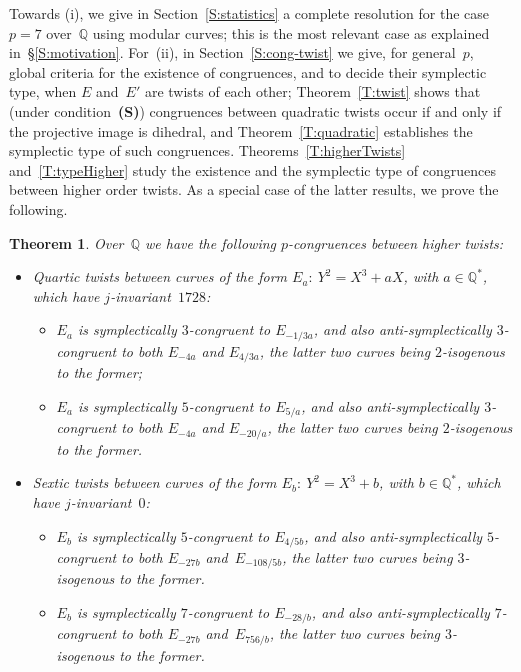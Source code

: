 \documentclass[twoside,leqno,symbols-for-thanks, draft]{rmi}
\numberwithin{equation}{section}
\newcommand{\Q}{\mathbb{Q}}
\newtheorem{theorem}{Theorem}[section]
\theoremstyle{remark}
\begin{document}
Towards (i), we give in Section~\ref{S:statistics} a complete
resolution for the case~$p=7$ over~$\Q$ using modular curves; this is the most relevant case as explained in~\S\ref{S:motivation}.
For~(ii), in
Section~\ref{S:cong-twist} we give, for general~$p$, global criteria
for the existence of congruences, and to decide their symplectic type, when $E$
and~$E'$ are twists of each other; Theorem~\ref{T:twist} shows that
(under condition~{\bf(S)}) congruences between quadratic twists occur if
and only if the projective image is dihedral, and
Theorem~\ref{T:quadratic} establishes the symplectic type of such
congruences. Theorems~\ref{T:higherTwists} and~\ref{T:typeHigher}
study the existence and the symplectic type of congruences between
higher order twists.  As a special case of the latter results, we prove
the following.

\begin{theorem}
\label{T:higherTwistsQ}
Over~$\Q$ we have the following 
$p$-congruences between higher twists:
\begin{itemize}
\item Quartic twists between curves of the form $E_a:\ Y^2=X^3+aX$,
  with $a \in \Q^*$, which have $j$-invariant~$1728$:
  \begin{itemize}
    \item
   $E_a$ is symplectically $3$-congruent to $E_{-1/3a}$, and also
      anti-symplectically $3$-congruent to both $E_{-4a}$ and
      $E_{4/3a}$, the latter two curves being $2$-isogenous to the
      former;
    \item
      $E_a$ is symplectically $5$-congruent to $E_{5/a}$, and also
      anti-symplectically $3$-congruent to both $E_{-4a}$ and
      $E_{-20/a}$, the latter two curves being $2$-isogenous to the
      former.
  \end{itemize}
\item Sextic twists between curves of the form $E_b:\ Y^2=X^3+b$, with
  $b \in \Q^*$, which have $j$-invariant~$0$:
  \begin{itemize}
    \item
      $E_b$ is symplectically $5$-congruent to $E_{4/5b}$, and also
      anti-symplectically $5$-congruent to both $E_{-27b}$
      and~$E_{-108/5b}$, the latter two curves being $3$-isogenous to
      the former.
    \item
      $E_b$ is symplectically $7$-congruent to $E_{-28/b}$, and also
      anti-symplectically $7$-congruent to both $E_{-27b}$
      and~$E_{756/b}$, the latter two curves being $3$-isogenous to
      the former.
  \end{itemize}
\end{itemize}
\end{theorem}
\end{document}
